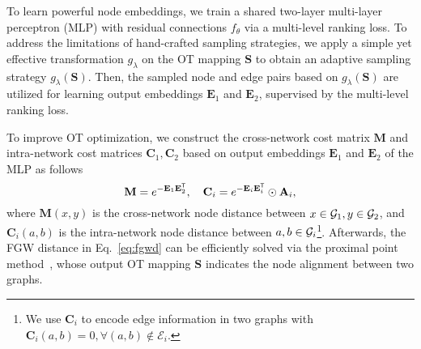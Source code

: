 To learn powerful node embeddings, we train a shared two-layer multi-layer perceptron (MLP) with residual connections $f_\theta$ via a multi-level ranking loss.
To address the limitations of hand-crafted sampling strategies, we apply a simple yet effective transformation $g_\lambda$ on the OT mapping $\mathbf{S}$ to obtain an adaptive sampling strategy $g_\lambda(\mathbf{S})$. Then, the sampled node and edge pairs based on $g_\lambda(\mathbf{S})$ are utilized for learning output embeddings $\mathbf{E}_1$ and $\mathbf{E}_2$, supervised by the multi-level ranking loss.

To improve OT optimization, we construct the cross-network cost matrix $\mathbf{M}$ and intra-network cost matrices $\mathbf{C}_1, \mathbf{C}_2$ based on output embeddings $\mathbf{E}_1$ and $\mathbf{E}_2$ of the MLP as follows
\vspace{-2pt}
\begin{equation}\label{eq:cost}
    \mathbf{M} = e^{-\mathbf{E}_1\mathbf{E}_2^{{\scriptscriptstyle\mathsf{T}}}},~~~\mathbf{C}_i = e^{-\mathbf{E}_i\mathbf{E}_i^{{\scriptscriptstyle\mathsf{T}}}}\odot\mathbf{A}_i,
\end{equation}
\vspace{-2pt}
where $\mathbf{M}(x,y)$ is the cross-network node distance between $x\in\mathcal{G}_1,y\in\mathcal{G}_2$, and $\mathbf{C}_i(a,b)$ is the intra-network node distance between $a,b\in\mathcal{G}_i$\footnote{We use $\mathbf{C}_i$ to encode edge information in two graphs with $\mathbf{C}_i(a,b)=0, \forall (a,b)\notin\mathcal{E}_i$.}. Afterwards, the FGW distance in Eq.~\eqref{eq:fgwd} can be efficiently solved via the proximal point method~\cite{s-gwl,parrot}, whose output OT mapping $\mathbf{S}$ indicates the node alignment between two graphs.


